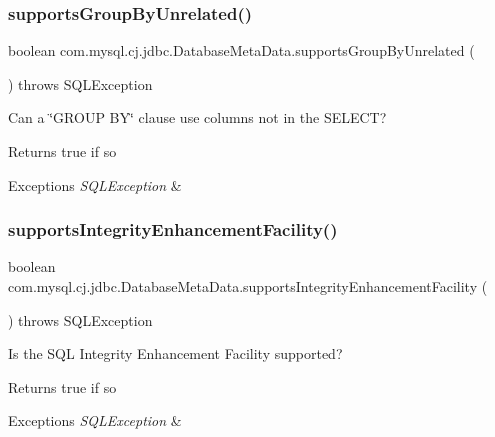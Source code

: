 \subsubsection{\texorpdfstring{supports\+Group\+By\+Unrelated()}{supportsGroupByUnrelated()}}
{\footnotesize\ttfamily boolean com.\+mysql.\+cj.\+jdbc.\+Database\+Meta\+Data.\+supports\+Group\+By\+Unrelated (\begin{DoxyParamCaption}{ }\end{DoxyParamCaption}) throws S\+Q\+L\+Exception}

Can a \char`\"{}\+G\+R\+O\+U\+P B\+Y\char`\"{} clause use columns not in the S\+E\+L\+E\+CT?

\begin{DoxyReturn}{Returns}
true if so 
\end{DoxyReturn}

\begin{DoxyExceptions}{Exceptions}
{\em S\+Q\+L\+Exception} & \\
\hline
\end{DoxyExceptions}
\mbox{\label{classcom_1_1mysql_1_1cj_1_1jdbc_1_1_database_meta_data_a05da0f08a0671d0ec87699253795a717}} 
\subsubsection{\texorpdfstring{supports\+Integrity\+Enhancement\+Facility()}{supportsIntegrityEnhancementFacility()}}
{\footnotesize\ttfamily boolean com.\+mysql.\+cj.\+jdbc.\+Database\+Meta\+Data.\+supports\+Integrity\+Enhancement\+Facility (\begin{DoxyParamCaption}{ }\end{DoxyParamCaption}) throws S\+Q\+L\+Exception}

Is the S\+QL Integrity Enhancement Facility supported?

\begin{DoxyReturn}{Returns}
true if so 
\end{DoxyReturn}

\begin{DoxyExceptions}{Exceptions}
{\em S\+Q\+L\+Exception} & \\
\hline
\end{DoxyExceptions}
\mbox{\label{classcom_1_1mysql_1_1cj_1_1jdbc_1_1_database_meta_data_af183fff36d3a59d863a2b46c54b89faf}} 
